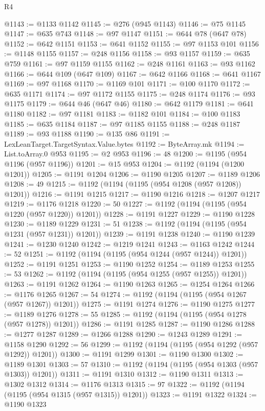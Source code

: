 \begin{lexlean}{R4}
\begin{coremodule}
@1143 := @1133 @1142
@1145 := @276 (@945 @1143)
@1146 := @75 @1145
@1147 := @635 @743
@1148 := @97 @1147
@1151 := @644 @78 (@647 @78)
@1152 := @642 @1151
@1153 := @641 @1152
@1155 := @97 @1153 @101
@1156 := @1148 @1155
@1157 := @248 @1156
@1158 := @93 @1157
@1159 := @635 @759
@1161 := @97 @1159 @1155
@1162 := @248 @1161
@1163 := @93 @1162
@1166 := @644 @109 (@647 @109)
@1167 := @642 @1166
@1168 := @641 @1167
@1169 := @97 @1168
@1170 := @1169 @101
@1171 := @100 @1170
@1172 := @635 @1171
@1174 := @97 @1172 @1155
@1175 := @248 @1174
@1176 := @93 @1175
@1179 := @644 @46 (@647 @46)
@1180 := @642 @1179
@1181 := @641 @1180
@1182 := @97 @1181
@1183 := @1182 @101
@1184 := @100 @1183
@1185 := @635 @1184
@1187 := @97 @1185 @1155
@1188 := @248 @1187
@1189 := @93 @1188
@1190 := @135 @86
@1191 := LexLeanTarget.TargetSyntax.Value.bytes
@1192 := ByteArray.mk
@1194 := List.toArray.{0} @953
@1195 := @2 @953
@1196 := 48
@1200 := @1195 (@954 @1196 (@957 @1196))
@1201 := @15 @953
@1204 := @1192 (@1194 (@1200 @1201))
@1205 := @1191 @1204
@1206 := @1190 @1205
@1207 := @1189 @1206
@1208 := 49
@1215 := @1192 (@1194 (@1195 (@954 @1208 (@957 @1208)) @1201))
@1216 := @1191 @1215
@1217 := @1190 @1216
@1218 := @1207 @1217
@1219 := @1176 @1218
@1220 := 50
@1227 := @1192 (@1194 (@1195 (@954 @1220 (@957 @1220)) @1201))
@1228 := @1191 @1227
@1229 := @1190 @1228
@1230 := @1189 @1229
@1231 := 51
@1238 := @1192 (@1194 (@1195 (@954 @1231 (@957 @1231)) @1201))
@1239 := @1191 @1238
@1240 := @1190 @1239
@1241 := @1230 @1240
@1242 := @1219 @1241
@1243 := @1163 @1242
@1244 := 52
@1251 := @1192 (@1194 (@1195 (@954 @1244 (@957 @1244)) @1201))
@1252 := @1191 @1251
@1253 := @1190 @1252
@1254 := @1189 @1253
@1255 := 53
@1262 := @1192 (@1194 (@1195 (@954 @1255 (@957 @1255)) @1201))
@1263 := @1191 @1262
@1264 := @1190 @1263
@1265 := @1254 @1264
@1266 := @1176 @1265
@1267 := 54
@1274 := @1192 (@1194 (@1195 (@954 @1267 (@957 @1267)) @1201))
@1275 := @1191 @1274
@1276 := @1190 @1275
@1277 := @1189 @1276
@1278 := 55
@1285 := @1192 (@1194 (@1195 (@954 @1278 (@957 @1278)) @1201))
@1286 := @1191 @1285
@1287 := @1190 @1286
@1288 := @1277 @1287
@1289 := @1266 @1288
@1290 := @1243 @1289
@1291 := @1158 @1290
@1292 := 56
@1299 := @1192 (@1194 (@1195 (@954 @1292 (@957 @1292)) @1201))
@1300 := @1191 @1299
@1301 := @1190 @1300
@1302 := @1189 @1301
@1303 := 57
@1310 := @1192 (@1194 (@1195 (@954 @1303 (@957 @1303)) @1201))
@1311 := @1191 @1310
@1312 := @1190 @1311
@1313 := @1302 @1312
@1314 := @1176 @1313
@1315 := 97
@1322 := @1192 (@1194 (@1195 (@954 @1315 (@957 @1315)) @1201))
@1323 := @1191 @1322
@1324 := @1190 @1323

\end{coremodule}
\end{lexlean}
